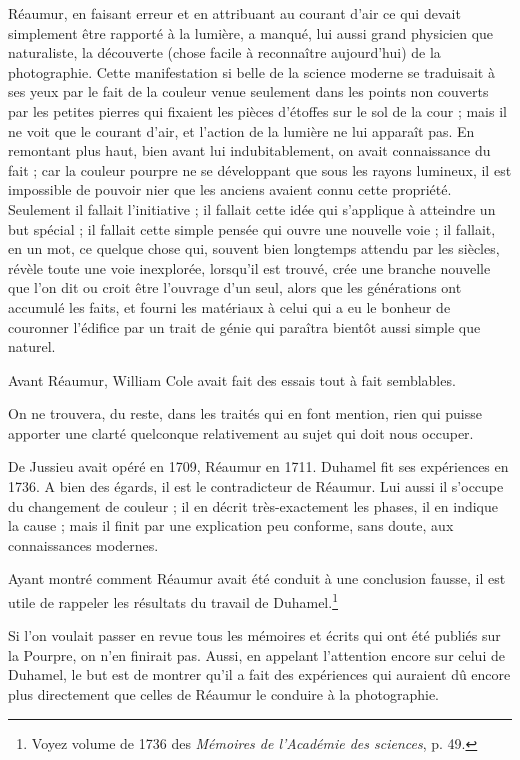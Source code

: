 \documentclass[a4paper, 11pt, oneside, polutonikogreek, french]{article}
\begin{document}
Réaumur, en faisant erreur et en attribuant au courant d'air ce qui devait simplement être rapporté à la lumière, a manqué, lui aussi grand physicien que naturaliste, la découverte (chose facile à reconnaître aujourd'hui) de la photographie. Cette manifestation si belle de la science moderne se traduisait à ses yeux par le fait de la couleur venue seulement dans les points non couverts par les petites pierres qui fixaient les pièces d'étoffes sur le sol de la cour ; mais il ne voit que le courant d'air, et l'action de la lumière ne lui apparaît pas. En remontant plus haut, bien avant lui indubitablement, on avait connaissance du fait ; car la couleur pourpre ne se développant que sous les rayons lumineux, il est impossible de pouvoir nier que les anciens avaient connu cette propriété. Seulement il fallait l'initiative ; il fallait cette idée qui s'applique à atteindre un but spécial ; il fallait cette simple pensée qui ouvre une nouvelle voie ; il fallait, en un mot, ce quelque chose qui, souvent bien longtemps attendu par les siècles, révèle toute une voie inexplorée, lorsqu'il est trouvé, crée une branche nouvelle que l'on dit ou croit être l'ouvrage d'un seul, alors que les générations ont accumulé les faits, et fourni les matériaux à celui qui a eu le bonheur de couronner l'édifice par un trait de génie qui paraîtra bientôt aussi simple que naturel.

Avant Réaumur, William Cole avait fait des essais tout à fait semblables.

On ne trouvera, du reste, dans les traités qui en font mention, rien qui puisse apporter une clarté quelconque relativement au sujet qui doit nous occuper.

De Jussieu avait opéré en 1709, Réaumur en 1711. Duhamel fit ses expériences en 1736. A bien des égards, il est le contradicteur de Réaumur. Lui aussi il s'occupe du changement de couleur ; il en décrit très-exactement les phases, il en indique la cause ; mais il finit par une explication peu conforme, sans doute, aux connaissances modernes.

Ayant montré comment Réaumur avait été conduit à une conclusion fausse, il est utile de rappeler les résultats du travail de Duhamel.\footnote{Voyez volume de 1736 des \emph{Mémoires de l'Académie des sciences}, p. 49.}

Si l'on voulait passer en revue tous les mémoires et écrits qui ont été publiés sur la Pourpre, on n'en finirait pas. Aussi, en appelant l'attention encore sur celui de Duhamel, le but est de montrer qu'il a fait des expériences qui auraient dû encore plus directement que celles de Réaumur le conduire à la photographie.
\end{document}
